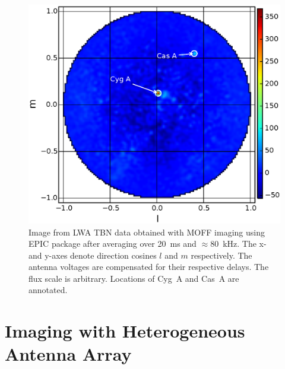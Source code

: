 \documentclass[a4paper,fleqn,usenatbib]{mnras}
\begin{document}
\begin{figure}
  \includegraphics[width=\columnwidth]{figure9}
  \caption{Image from LWA TBN data obtained with MOFF imaging using EPIC 
    package after averaging over 20~ms and $\approx 80$~kHz. The x- and y-axes
    denote direction cosines $l$ and $m$ respectively. The antenna voltages
    are compensated for their respective delays. The flux scale is arbitrary.
    Locations of Cyg~A and Cas~A are annotated.}
  \label{fig:LWA-image}
\end{figure}

\section{Imaging with Heterogeneous Antenna Array}\label{sec:versatility}
\end{document}
